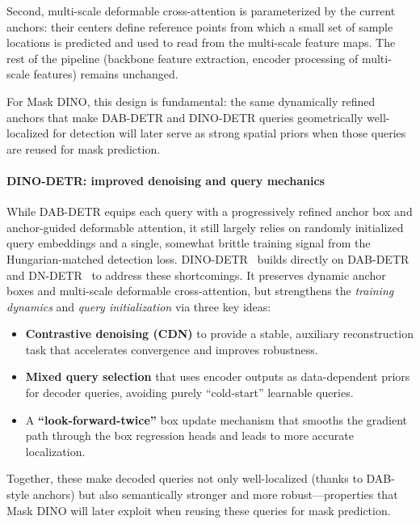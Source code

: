\begin{enrichment}
\begin{enrichment}
		\noindent \medskip
		Second, multi-scale deformable cross-attention is parameterized by the current anchors: their centers define reference points from which a small set of sample locations is predicted and used to read from the multi-scale feature maps. The rest of the pipeline (backbone feature extraction, encoder processing of multi-scale features) remains unchanged. 
		
		\noindent \medskip
		For Mask DINO, this design is fundamental: the same dynamically refined anchors that make DAB-DETR and DINO-DETR queries geometrically well-localized for detection will later serve as strong spatial priors when those queries are reused for mask prediction.
		
		\paragraph{DINO-DETR: improved denoising and query mechanics}
		While DAB-DETR equips each query with a progressively refined anchor box and anchor-guided deformable attention, it still largely relies on randomly initialized query embeddings and a single, somewhat brittle training signal from the Hungarian-matched detection loss. DINO-DETR~\cite{zhang2022_dino} builds directly on DAB-DETR and DN-DETR~\cite{li2022_dn_detr} to address these shortcomings. It preserves dynamic anchor boxes and multi-scale deformable cross-attention, but strengthens the \emph{training dynamics} and \emph{query initialization} via three key ideas:
		\begin{itemize}
			\item \textbf{Contrastive denoising (CDN)} to provide a stable, auxiliary reconstruction task that accelerates convergence and improves robustness.
			\item \textbf{Mixed query selection} that uses encoder outputs as data-dependent priors for decoder queries, avoiding purely ``cold-start'' learnable queries.
			\item A \textbf{``look-forward-twice''} box update mechanism that smooths the gradient path through the box regression heads and leads to more accurate localization.
		\end{itemize}
		
		\medskip
		Together, these make decoded queries not only well-localized (thanks to DAB-style anchors) but also semantically stronger and more robust---properties that Mask DINO will later exploit when reusing these queries for mask prediction.
		

\end{enrichment}
\end{enrichment}
